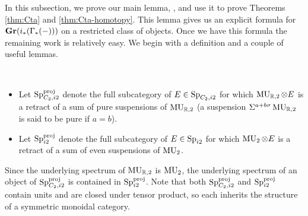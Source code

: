 
In this subsection, we prove our main lemma, , and use it to prove Theorems \ref{thm:Cta} and \ref{thm:Cta-homotopy}. This lemma gives us an explicit formula for $\operatorname{\mathbf{Gr}}(i_*(\Gamma_*(-)))$ on a restricted class of objects. Once we have this formula the remaining work is relatively easy.
We begin with a definition and a couple of useful lemmas.

\begin{dfn}\ 
  \begin{itemize}
  \item Let $\operatorname{\mathrm{Sp}}_{C_2, i2} ^{\mathrm{proj}}$ denote the full subcategory of $E \in \operatorname{\mathrm{Sp}}_{C_2, i2}$ for which $\operatorname{\mathrm{MU}}_{\mathbb{R},2} \otimes E$ is a retract of a sum of pure suspensions of $\operatorname{\mathrm{MU}}_{\mathbb{R},2}$ (a suspension $\Sigma^{a+b\sigma} \operatorname{\mathrm{MU}}_{\mathbb{R},2}$ is said to be pure if $a=b$). 
  \item Let $\operatorname{\mathrm{Sp}}_{i2} ^{\mathrm{proj}}$ denote the full subcategory of $E \in \operatorname{\mathrm{Sp}}_{i2}$ for which $\operatorname{\mathrm{MU}}_{2} \otimes E$ is a retract of a sum of even suspensions of $\operatorname{\mathrm{MU}}_2$.
  \end{itemize}
  Since the underlying spectrum of $\operatorname{\mathrm{MU}}_{\mathbb{R}, 2}$ is $\operatorname{\mathrm{MU}}_2$, the underlying spectrum of an object of $\operatorname{\mathrm{Sp}}_{C_2, i2} ^{\mathrm{proj}}$ is contained in $\operatorname{\mathrm{Sp}}_{i2} ^{\mathrm{proj}}$.
  Note that both $\operatorname{\mathrm{Sp}}_{C_2,i2} ^{\mathrm{proj}}$ and $\operatorname{\mathrm{Sp}}_{i2} ^{\mathrm{proj}}$ contain units and are closed under tensor product, so each inherits the structure of a symmetric monoidal category.
\end{dfn}






